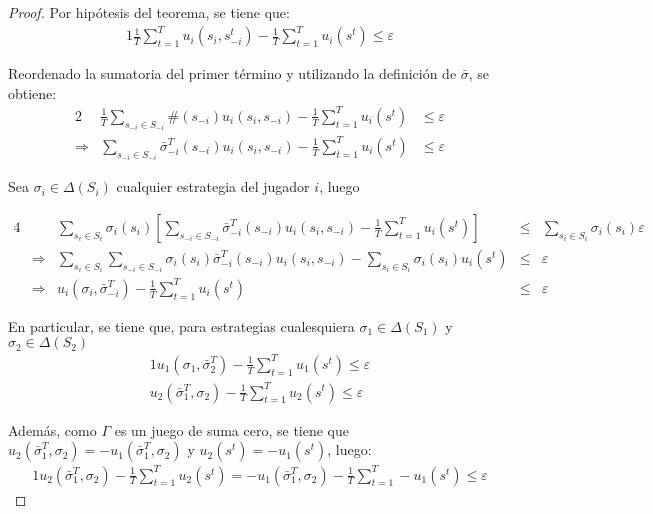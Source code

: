 \begin{proof}
Por hipótesis del teorema, se tiene que:
\begin{alignat}{1}
\frac{1}{T} \sum_{t = 1}^T u_i(s_i, s_{-i}^t) - \frac{1}{T} \sum_{t = 1}^T u_i(s^t) \leq \varepsilon
\end{alignat}

Reordenado la sumatoria del primer término y utilizando la definición de $\bar\sigma$, se obtiene:
\begin{alignat}{2}
& \frac{1}{T} \sum_{s_{-i} \in S_{-i}} \#(s_{-i})u_i(s_i, s_{-i}) - \frac{1}{T} \sum_{t = 1}^Tu_i(s^t)  & \leq \varepsilon \\
\Rightarrow & \sum_{s_{-i} \in S_{-i}} \bar{\sigma}_{-i}^T(s_{-i})u_i(s_i, s_{-i}) - \frac{1}{T} \sum_{t = 1}^T u_i(s^t) & \leq \varepsilon
\end{alignat}

Sea $\sigma_i \in \Delta(S_i)$ cualquier estrategia del jugador $i$, luego

\begin{alignat}{4}
& & \sum_{s_i \in S_i} \sigma_i(s_i) \left[ \sum_{s_{-i} \in S_{-i}} \bar{\sigma}_{-i}^T(s_{-i})u_i(s_i, s_{-i}) - \frac{1}{T} \sum_{t = 1}^T u_i(s^t) \right] & \leq & \sum_{s_i \in S_i} \sigma_i(s_i) \varepsilon \\
& \Rightarrow & \sum_{s_i \in S_i} \sum_{s_{-i} \in S_{-i}} \sigma_i(s_i)\bar{\sigma}_{-i}^T(s_{-i}) u_i(s_i, s_{-i}) - \sum_{s_i \in S_i} \sigma_i(s_i)u_i(s^t) & \leq & \varepsilon \\
& \Rightarrow & u_i(\sigma_i, \bar{\sigma}_{-i}^T) - \frac{1}{T} \sum_{t = 1}^T u_i(s^t) & \leq & \varepsilon
\end{alignat}

En particular, se tiene que, para estrategias cualesquiera $\sigma_1 \in \Delta(S_1)$ y $\sigma_2 \in \Delta(S_2)$
\begin{alignat}{1}
\label{eq:star1}
u_1(\sigma_1, \bar{\sigma}_2^T) - \frac{1}{T} \sum_{t=1}^T u_1(s^t) \leq \varepsilon \\
u_2(\bar{\sigma}_1^T, \sigma_2) - \frac{1}{T} \sum_{t=1}^T u_2(s^t) \leq \varepsilon
\end{alignat}

Además, como $\Gamma$ es un juego de suma cero, se tiene que $u_2(\bar{\sigma}_1^T, \sigma_2) = -u_1(\bar{\sigma}_1^T, \sigma_2)$ y $u_2(s^t) = -u_1(s^t)$, luego:
\begin{alignat}{1}
u_2(\bar{\sigma}_1^T, \sigma_2) - \frac{1}{T} \sum_{t=1}^T u_2(s^t) = -u_1(\bar{\sigma}_1^T, \sigma_2) - \frac{1}{T} \sum_{t=1}^T -u_1(s^t) \leq \varepsilon
\end{alignat}


\end{proof}
